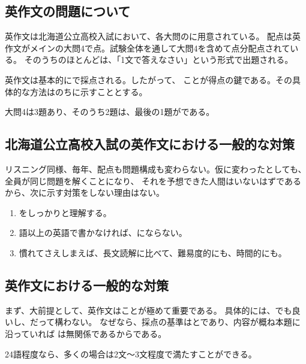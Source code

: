\subsection{英作文の問題について}
    英作文は北海道公立高校入試において、各大問のに用意されている。
    配点は英作文がメインの大問4で点。試験全体を通して大問4を含めて点分配点されている。
    そのうちのほとんどは、「1文で答えなさい」という形式で出題される。

    英作文は基本的にで採点される。したがって、
    ことが得点の鍵である。その具体的な方法はのちに示すこととする。

    大問4は3題あり、そのうち2題は、最後の1題がである。

\subsection{北海道公立高校入試の英作文における一般的な対策}
    リスニング同様、毎年、配点も問題構成も変わらない。仮に変わったとしても、全員が同じ問題を解くことになり、
    それを予想できた人間はいないはずであるから、次に示す対策をしない理由はない。

    \begin{enumerate}
        \item {}をしっかりと理解する。
        \item {}語以上の英語で書かなければ、にならない。
        \item 慣れてさえしまえば、長文読解に比べて、難易度的にも、時間的にも。
    \end{enumerate}

\subsection{英作文における一般的な対策}
    まず、大前提として、英作文はことが極めて重要である。
    具体的には、でも良いし、だって構わない。
    なぜなら、採点の基準はとであり、内容が概ね本題に沿っていれば
    は無関係であるからである。

    24語程度なら、多くの場合は2文〜3文程度で満たすことができる。

